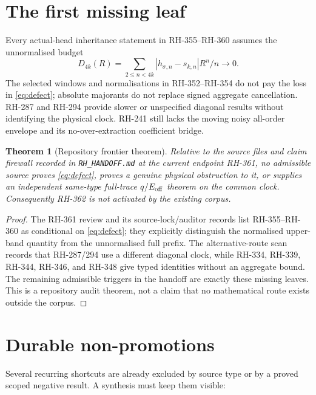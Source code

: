 \documentclass[11pt]{article}
\newtheorem{theorem}{Theorem}[section]
\theoremstyle{definition}
\theoremstyle{remark}
\newcommand{\Eoff}{E_{\rm off}}
\begin{document}
\section{The first missing leaf}

Every actual-head inheritance statement in RH-355--RH-360 assumes the
unnormalised budget
\begin{equation}
 D_{4k}(R)=\sum_{2\le n<4k}|h_{\sigma,n}-s_{k,n}|R^n/n\to0. \label{eq:defect}
\end{equation}
The selected windows and normalisations in RH-352--RH-354 do not pay the
loss in \eqref{eq:defect}; absolute majorants do not replace signed aggregate
cancellation.  RH-287 and RH-294 provide slower or unspecified diagonal
results without identifying the physical clock.  RH-241 still lacks the
moving noisy all-order envelope and its no-over-extraction coefficient bridge.

\begin{theorem}[Repository frontier theorem]
Relative to the source files and claim firewall recorded in
\texttt{RH\_HANDOFF.md} at the current endpoint RH-361, no admissible source
proves \eqref{eq:defect}, proves a genuine physical obstruction to it, or
supplies an independent same-type full-trace $q/\Eoff$ theorem on the common
clock.  Consequently RH-362 is not activated by the existing corpus.
\end{theorem}
\begin{proof}
The RH-361 review and its source-lock/auditor records list RH-355--RH-360 as
conditional on \eqref{eq:defect}; they explicitly distinguish the normalised
upper-band quantity from the unnormalised full prefix.  The alternative-route
scan records that RH-287/294 use a different diagonal clock, while RH-334,
RH-339, RH-344, RH-346, and RH-348 give typed identities without an aggregate
bound.  The remaining admissible triggers in the handoff are exactly these
missing leaves.  This is a repository audit theorem, not a claim that no
mathematical route exists outside the corpus.
\end{proof}

\section{Durable non-promotions}

Several recurring shortcuts are already excluded by source type or by a
proved scoped negative result.  A synthesis must keep them visible:
\end{document}
